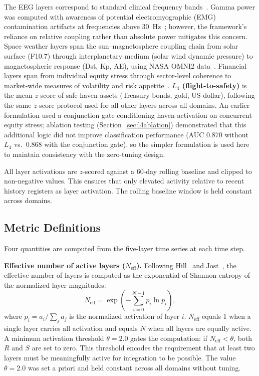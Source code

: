 \documentclass[aip,cha,reprint,amsmath,amssymb,final]{revtex4-2}
\begin{document}
The EEG layers correspond to standard clinical frequency bands~\cite{berry2017,oppenheim1997}. Gamma power was computed with awareness of potential electromyographic (EMG) contamination artifacts at frequencies above 30~Hz~\cite{muthukumaraswamy2013}; however, the framework's reliance on relative coupling rather than absolute power mitigates this concern. Space weather layers span the sun--magnetosphere coupling chain from solar surface (F10.7) through interplanetary medium (solar wind dynamic pressure) to magnetospheric response (Dst, Kp, AE), using NASA OMNI2 data~\cite{papitashvili2020}. Financial layers span from individual equity stress through sector-level coherence to market-wide measures of volatility and risk appetite~\cite{forbes2002}. \textbf{$L_4$ (flight-to-safety)} is the mean $z$-score of safe-haven assets (Treasury bonds, gold, US dollar), following the same $z$-score protocol used for all other layers across all domains. An earlier formulation used a conjunction gate conditioning haven activation on concurrent equity stress; ablation testing (Section~\ref{sec:l4ablation}) demonstrated that this additional logic did not improve classification performance (AUC 0.870 without $L_4$ vs.\ 0.868 with the conjunction gate), so the simpler formulation is used here to maintain consistency with the zero-tuning design.

All layer activations are $z$-scored against a 60-day rolling baseline and clipped to non-negative values. This ensures that only elevated activity relative to recent history registers as layer activation. The rolling baseline window is held constant across domains.

\subsection{Metric Definitions}

Four quantities are computed from the five-layer time series at each time step.

\textbf{Effective number of active layers ($N_\text{eff}$).} Following Hill~\cite{hill1973} and Jost~\cite{jost2006}, the effective number of layers is computed as the exponential of Shannon entropy of the normalized layer magnitudes:
\begin{equation}
N_{\text{eff}} = \exp\left( -\sum_{i=0}^{N-1} p_i \ln p_i \right),
\end{equation}
where $p_i = a_i / \sum_j a_j$ is the normalized activation of layer $i$. $N_\text{eff}$ equals 1 when a single layer carries all activation and equals $N$ when all layers are equally active. A minimum activation threshold $\theta = 2.0$ gates the computation: if $N_\text{eff} < \theta$, both $R$ and $S$ are set to zero. This threshold encodes the requirement that at least two layers must be meaningfully active for integration to be possible. The value $\theta = 2.0$ was set a priori and held constant across all domains without tuning.
\end{document}
